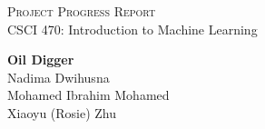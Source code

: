 \documentclass[11pt, a4paper]{article}
\begin{document}
    \begin{titlepage}
        \begin{center}
            \vspace*{2in}
            {\Large \textsc{Project Progress Report}}\\
            \vspace*{0.1in}
            CSCI 470: Introduction to Machine Learning\\
            \vspace*{0.1in}
            \date{\today}
            
            \vspace*{3in}
            \large{\textbf{Oil Digger}} \\
            \vspace*{0.1in}
            \large{Nadima Dwihusna} \\
            \vspace*{0.1in}
            \large{Mohamed Ibrahim Mohamed} \\
            \vspace*{0.1in}
            \large{Xiaoyu (Rosie) Zhu} \\
        \end{center}
    \end{titlepage}
    
\end{document}
